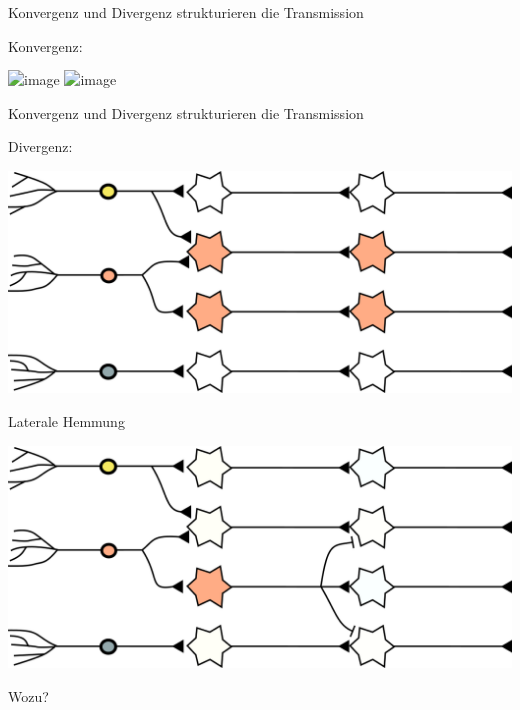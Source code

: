 \documentclass[aspectratio=169]{beamer}
\begin{document}
\begin{frame}{Konvergenz und Divergenz strukturieren die Transmission}

Konvergenz:

\begin{center}
    \includegraphics<1>[width=\textwidth]{konvergenz_1.png}
    \includegraphics<2>[width=\textwidth]{konvergenz_2.png}
\end{center}


\end{frame}



\begin{frame}{Konvergenz und Divergenz strukturieren die Transmission}

Divergenz:

\begin{center}
    \includegraphics[width=\textwidth]{divergenz.png}
\end{center}


\end{frame}


\begin{frame}{Laterale Hemmung}

\begin{center}
    \includegraphics[width=\textwidth]{lateral_inhibition_detail.png}
\end{center}

Wozu?

\end{frame}
\end{document}
